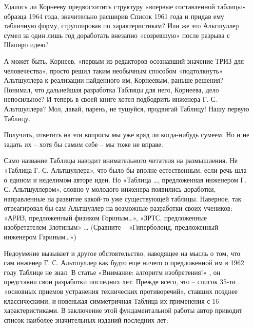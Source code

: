 \documentclass[11pt,a4paper]{article}
\begin{document}
Удалось ли Корнееву предвосхитить структуру «впервые составленной таблицы»
образца 1964 года, значительно расширив Список 1961 года и придав ему
табличную форму, сгруппировав по характеристикам? Или же это Альтшуллер сумел
за один лишь год доработать внезапно «созревшую» после разрыва с Шапиро идею?

А может быть, Корнеев, «первым из редакторов осознавший значение ТРИЗ для
человечества», просто решил таким необычным способом «подтолкнуть» Альтшуллера
к реализации найденного им, Корнеевым, раньше решения? Понимал, что дальнейшая
разработка Таблицы для него, Корнеева, дело непосильное? И теперь в своей
книге хотел подбодрить инженера Г. С. Альтшуллера? Мол, давай, парень, не
тушуйся, продвигай Таблицу! Нашу первую Таблицу.

Получить, ответить на эти вопросы мы уже вряд ли когда-нибудь сумеем. Но и не
задать их -- хотя бы самим себе -- мы тоже не вправе.

Само название Таблицы наводит внимательного читателя на размышления. Не
«Таблица Г. С. Альтшуллера», что было бы вполне естественным, если речь шла о
едином и неделимом авторе идеи. Но «Таблица …, предложенная инженером
Г. С. Альтшуллером», словно у молодого инженера появились доработки,
направленные на развитие какой-то уже существующей таблицы. Наверное, так
отреагировал бы сам Альтшуллер на возможные разработки своих учеников: «АРИЗ,
предложенный физиком Гориным…», «ЗРТС, предложенные изобретателем Злотиным» …
(Сравните -- «Гиперболоид, предложенный инженером Гариным…»)

Недоумение вызывает и другое обстоятельство, наводящее на мысль о том, что сам
инженер Г. С. Альтшуллер как будто еще ничего о предложенной им в 1962 году
Таблице не знал. В статье «Внимание: алгоритм изобретения!»
\cite{Altshuller1965}, он представил свои разработки последних лет. Прежде
всего, это -- список 35-ти «основных приемов устранения технических
противоречий», ставших позднее классическими, и новенькая симметричная Таблица
их применения с 16 характеристиками. В заключение этой фундаментальной работы
автор приводит список наиболее значительных изданий последних лет:
\end{document}
